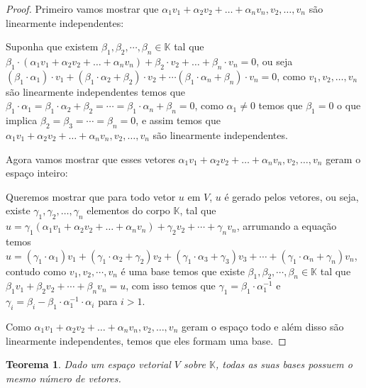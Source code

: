 \documentclass{article}
\newtheorem{theorem}{Teorema}[section]
\newcommand{\KK}{\mathbb{K} }
\begin{document}
\begin{proof}
Primeiro vamos mostrar que $\alpha_1v_1 + \alpha_2v_2 +\dots + \alpha_nv_n, v_2,\dots,v_n $ são linearmente independentes:

Suponha que existem $\beta_1,\beta_2,\cdots,\beta_n \in \KK$ tal que $\beta_1 \cdot (\alpha_1v_1 + \alpha_2v_2 +\dots + \alpha_n v_n) + \beta_2 \cdot v_2 + \dots + \beta_n \cdot  v_n = 0$, ou seja $ (\beta_1 \cdot \alpha_1) \cdot v_1 + (\beta_1 \cdot \alpha_2 + \beta_2)\cdot v_2 + \cdots (\beta_1 \cdot \alpha_n + \beta_n)\cdot v_n = 0$, como $v_1,v_2,\dots,v_n$ são linearmente independentes temos que $\beta_1 \cdot \alpha_1 = \beta_1 \cdot \alpha_2 + \beta_2 = \cdots = \beta_1 \cdot \alpha_n + \beta_n = 0$, como $\alpha_1 \ne 0$ temos que $\beta_1 = 0$ o que implica $\beta_2 = \beta_3 = \cdots = \beta_n = 0$, e assim temos que  $\alpha_1v_1 + \alpha_2v_2 +\dots + \alpha_nv_n, v_2,\dots,v_n$ são linearmente independentes.

Agora vamos mostrar que esses vetores $\alpha_1v_1 + \alpha_2v_2 +\dots + \alpha_nv_n, v_2,\dots,v_n $ geram o espaço inteiro:

Queremos mostrar que para todo vetor $u$  em $V$, $u$ é gerado pelos vetores, ou seja, existe $\gamma_1,\gamma_2, \dots, \gamma_n$ elementos do corpo
$\KK$, tal que $u = \gamma_1  (\alpha_1v_1 + \alpha_2v_2 +\dots + \alpha_nv_n) + \gamma_2 v_2 + \cdots + \gamma_n v_n$, arrumando a equação temos $u = (\gamma_1 \cdot \alpha_1) v_1 + (\gamma_1 \cdot \alpha_2 + \gamma_2) v_2 + (\gamma_1 \cdot \alpha_3 + \gamma_3) v_3 + \cdots + (\gamma_1 \cdot \alpha_n + \gamma_n) v_n$, contudo como $v_1,v_2,\cdots,v_n$ é uma base temos que existe $\beta_1,\beta_2,\cdots,\beta_n \in \KK$ tal que $\beta_1 v_1 + \beta_2 v_2 + \cdots + \beta_n v_n = u$, com isso temos que
$\gamma_1 = \beta_1 \cdot \alpha_1^{-1}$ e $\gamma_i = \beta_i - \beta_1 \cdot \alpha_1^{-1} \cdot \alpha_i$ para $i>1$.

Como $\alpha_1v_1 + \alpha_2v_2 +\dots + \alpha_nv_n, v_2,\dots,v_n$ geram o espaço todo e além disso são linearmente independentes, temos que eles formam uma base.
\end{proof} 

\newpage

\begin{theorem}
Dado um espaço vetorial $V$ sobre $\KK$, todas as suas bases possuem o mesmo número de vetores.
\end{theorem}
\end{document}
